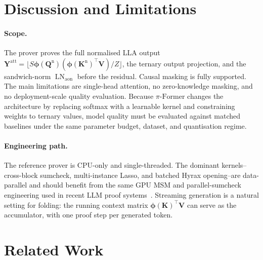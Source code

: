 \documentclass[letterpaper,twocolumn,10pt]{article}
\theoremstyle{remark}
\theoremstyle{definition}
\newcommand{\sys}{\ensuremath{\pi\text{-Former}}}
\newcommand{\bphi}{\boldsymbol{\phi}}
\newcommand{\bY}{\mathbf{Y}}
\newcommand{\bQ}{\mathbf{Q}}
\newcommand{\bK}{\mathbf{K}}
\newcommand{\bV}{\mathbf{V}}
\DeclareMathOperator{\LN}{LN}
\begin{document}
\section{Discussion and Limitations}
\label{sec:disc}

\paragraph{Scope.}
The prover proves the full normalised LLA output
$\bY^{\mathrm{att}}\!=\!\lfloor S\bphi(\bQ^{\mathrm n})(\bphi(\bK^{\mathrm n})^\top\bV)/Z\rfloor$,
the ternary output projection, and the sandwich-norm
$\LN_{\mathrm{aon}}$ before the residual. Causal masking is fully
supported. The main limitations are single-head attention, no
zero-knowledge masking, and no deployment-scale quality evaluation.
Because \sys{} changes the architecture by replacing softmax with a
learnable kernel and constraining weights to ternary values, model
quality must be evaluated against matched baselines under the same
parameter budget, dataset, and quantisation regime.

\paragraph{Engineering path.}
The reference prover is CPU-only and single-threaded. The dominant
kernels--cross-block sumcheck, multi-instance Lasso, and batched
Hyrax opening--are data-parallel and should benefit from the same GPU
MSM and parallel-sumcheck engineering used in recent LLM proof
systems~\cite{sun2024zkllm,qu2025zkgpt}. Streaming generation is a
natural setting for folding: the running context matrix
$\bphi(\bK)^\top\bV$ can serve as the accumulator, with one proof step
per generated token.

\section{Related Work}
\label{sec:related}
\end{document}
